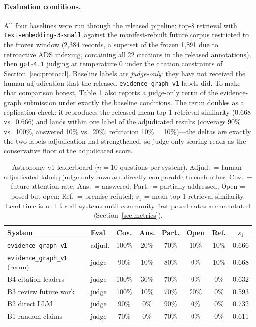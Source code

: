 \paragraph{Evaluation conditions.} All four baselines were run through
the released pipeline: top-8 retrieval with
\texttt{text-embedding-3-small} against the manifest-rebuilt future
corpus restricted to the frozen window (2{,}384 records, a superset of
the frozen 1{,}891 due to retroactive ADS indexing, containing all 22
citations in the released annotations), then \texttt{gpt-4.1} judging
at temperature 0 under the citation constraints of
Section~\ref{sec:protocol}. Baseline labels are \emph{judge-only}: they
have not received the human adjudication that the released
\texttt{evidence\_graph\_v1} labels did. To make that comparison
honest, Table~\ref{tab:leaderboard} also reports a judge-only rerun of
the evidence-graph submission under exactly the baseline conditions.
The rerun doubles as a replication check: it reproduces the released
mean top-1 retrieval similarity (0.668 vs.\ 0.666) and lands within one
label of the adjudicated results (coverage 90\% vs.\ 100\%, answered
10\% vs.\ 20\%, refutation 10\% = 10\%)---the deltas are exactly the
two labels adjudication had strengthened, so judge-only scoring reads
as the conservative floor of the adjudicated score.

\begin{table}[t]
  \centering
  \small
  \caption{Astronomy v1 leaderboard ($n=10$ questions per system).
  Adjud.\ = human-adjudicated labels; judge-only rows are directly
  comparable to each other. Cov.\ = future-attention rate; Ans.\ =
  answered; Part.\ = partially addressed; Open = posed but open; Ref.\ =
  premise refuted; $s_1$ = mean top-1 retrieval similarity. Lead time
  is null for all systems until community first-posed dates are
  annotated (Section~\ref{sec:metrics}).}
  \label{tab:leaderboard}
  \begin{tabular}{@{}llcccccc@{}}
    \toprule
    System & Eval & Cov. & Ans. & Part. & Open & Ref. & $s_1$ \\
    \midrule
    \texttt{evidence\_graph\_v1} \citep{paper1} & adjud. & 100\% & 20\% & 70\% & 10\% & 10\% & 0.666 \\
    \midrule
    \texttt{evidence\_graph\_v1} (rerun) & judge & 90\% & 10\% & 80\% & 0\% & 10\% & 0.668 \\
    B4 citation leaders     & judge & 100\% & 30\% & 70\% & 0\% & 0\% & 0.632 \\
    B3 review future work   & judge & 100\% & 10\% & 70\% & 20\% & 0\% & 0.593 \\
    B2 direct LLM           & judge & 90\% & 0\% & 90\% & 0\% & 0\% & 0.732 \\
    B1 random claims        & judge & 70\% & 0\% & 70\% & 0\% & 0\% & 0.611 \\
    \bottomrule
  \end{tabular}
\end{table}


